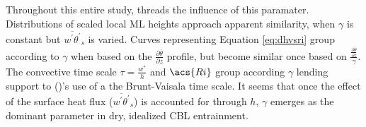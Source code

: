 Throughout this entire study, threads the influence of this paramater.  Distributions of scaled local \acs{ML} heights approach apparent similarity, when $\gamma$ is constant but $\overline{w^{'}\theta^{'}}_{s}$ is varied.  Curves representing Equation \ref{eq:dhvsri} group according to $\gamma$ when based on the $\frac{\partial \overline{\theta}}{\partial z}$ profile, but become similar once based on $\frac{\frac{\partial \overline{\theta}}{\partial z}}{\gamma}$.  The convective time scale $\tau = \frac{w^{*}}{h}$ and $\acs{Ri}$ group according $\gamma$ lending support to \citeauthor{FedConzMir04} (\citeyear{FedConzMir04})'s use of a the Brunt-Vaisala time scale.  It seems that once the effect of the surface heat flux ($\overline{w^{'}\theta^{'}}_{s}$) is accounted for through $h$, $\gamma$ emerges as the dominant parameter in dry, idealized \acs{CBL} entrainment.\\ 

\FloatBarrier


\endinput

Any text after an \endinput is ignored.
You could put scraps here or things in progress.
